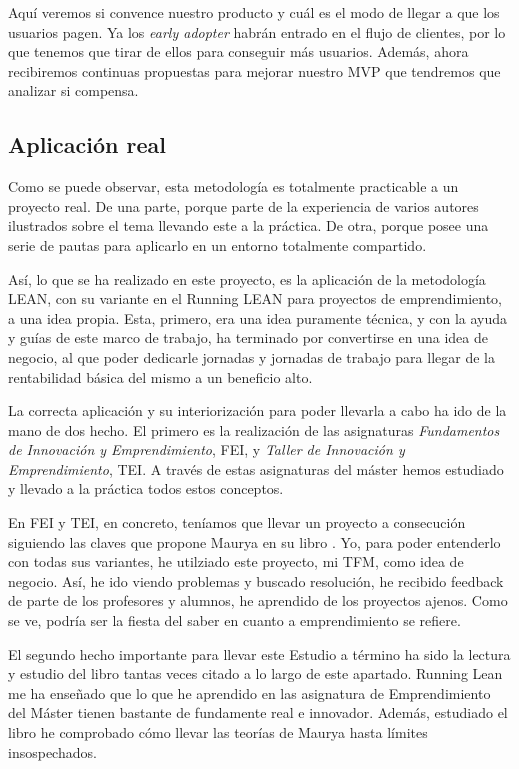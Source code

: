 Aquí veremos si convence nuestro producto y cuál es el modo de llegar a que los usuarios pagen. Ya los \textit{early adopter} habrán entrado en el flujo de clientes, por lo que tenemos que tirar de ellos para conseguir más usuarios. Además, ahora recibiremos continuas propuestas para mejorar nuestro MVP que tendremos que analizar si compensa.

\subsection{Aplicación real}

Como se puede observar, esta metodología es totalmente practicable a un proyecto real. De una parte, porque parte de la experiencia de varios autores ilustrados sobre el tema llevando este a la práctica. De otra, porque posee una serie de pautas para aplicarlo en un entorno totalmente compartido.

Así, lo que se ha realizado en este proyecto, es la aplicación de la metodología LEAN, con su variante en el Running LEAN para proyectos de emprendimiento, a una idea propia. Esta, primero, era una idea puramente técnica, y con la ayuda y guías de este marco de trabajo, ha terminado por convertirse en una idea de negocio, al que poder dedicarle jornadas y jornadas de trabajo para llegar de la rentabilidad básica del mismo a un beneficio alto.

La correcta aplicación y su interiorización para poder llevarla a cabo ha ido de la mano de dos hecho. El primero es la realización de las asignaturas \textit{Fundamentos de Innovación y Emprendimiento}, FEI, y \textit{Taller de Innovación y Emprendimiento}, TEI. A través de estas asignaturas del máster hemos estudiado y llevado a la práctica todos estos conceptos.

En FEI y TEI, en concreto, teníamos que llevar un proyecto a consecución siguiendo las claves que propone Maurya en su libro . Yo, para poder entenderlo con todas sus variantes, he utilziado este proyecto, mi TFM, como idea de negocio. Así, he ido viendo problemas y buscado resolución, he recibido feedback de parte de los profesores y alumnos, he aprendido de los proyectos ajenos. Como se ve, podría ser la fiesta del saber en cuanto a emprendimiento se refiere.

El segundo hecho importante para llevar este Estudio a término ha sido la lectura y estudio del libro tantas veces citado a lo largo de este apartado. Running Lean me ha enseñado que lo que he aprendido en las asignatura de Emprendimiento del Máster tienen bastante de fundamente real e innovador. Además, estudiado el libro he comprobado cómo llevar las teorías de Maurya hasta límites insospechados.

